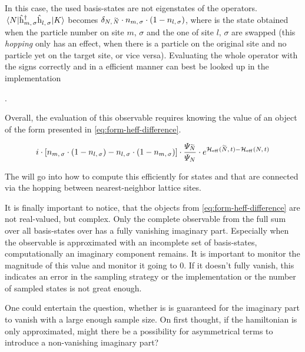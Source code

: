 In this case, the used basis-states are not eigenstates of the operators. 
$\bracketHelper{N}{\withspinhcop{m}{\sigma}{\dagger}\withspinhcop{l}{\sigma}{}}{K}$ becomes $\delta_{N,\,\vphantom{N}\smash{\tilde{N}}}\cdot n_{m,\,\sigma} \cdot (1-n_{l,\,\sigma} )$, where  is the state obtained when the particle number on site $m,\, \sigma$ and the one of site $l,\, \sigma$ are swapped (this \emph{hopping} only has an effect, when there is a particle on the original site and no particle yet on the target site, or vice versa).
Evaluating the whole operator with the signs correctly and in a efficient manner can best be looked up in the implementation 

.

Overall, the evaluation of this observable requires knowing the value of an object of the form presented in \autoref{eq:form-heff-difference}.

\begin{equation}
    \label{eq:form-heff-difference}
    i \cdot 
    \left[
        n_{m,\,\sigma} \cdot (1-n_{l,\,\sigma})
        -
        n_{l,\,\sigma} \cdot (1-n_{m,\,\sigma})
    \right]
    \cdot 
    \frac{\psiN[\vphantom{N}\smash{\tilde{N}}]}{\psiN}
    \cdot 
     e^{\HeffOft[\vphantom{N}\smash{\tilde{N}}]-\HeffOft[N]}
\end{equation}

The  will go into how to compute this efficiently for states \ketN[N] and  that are connected via the hopping between nearest-neighbor lattice sites.

It is finally important to notice, that the objects from \autoref{eq:form-heff-difference} are not real-valued, but complex.
Only the complete observable from the full sum over all basis-states \ketN over  has a fully vanishing imaginary part. 
Especially when the observable is approximated with an incomplete set of basis-states, computationally an imaginary component remains. 
It is important to monitor the magnitude of this value and monitor it going to $0$.
If it doesn't fully vanish, this indicates an error in the sampling strategy or the implementation or the number of sampled states is not great enough.

One could entertain the question, whether is is guaranteed for the imaginary part to vanish with a large enough sample size.
On first thought, if the hamiltonian is only approximated, might there be a possibility for asymmetrical terms to introduce a non-vanishing imaginary part?

